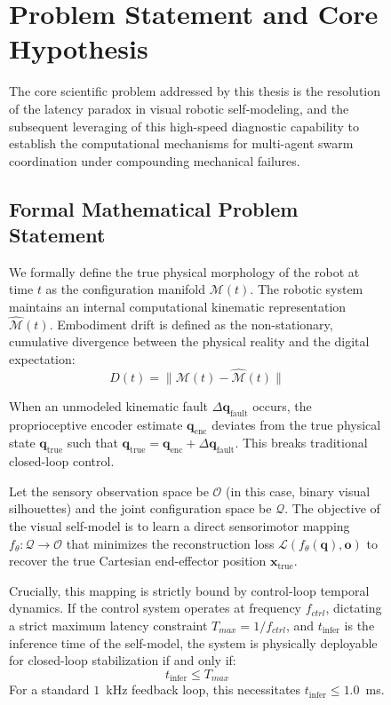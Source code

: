\documentclass[12pt,a4paper,oneside]{report}
\begin{document}
\begin{figure}[H]
\section{Problem Statement and Core Hypothesis}
\label{sec:problem_hypothesis_intro}

The core scientific problem addressed by this thesis is the resolution of the latency paradox in visual robotic self-modeling, and the subsequent leveraging of this high-speed diagnostic capability to establish the computational mechanisms for multi-agent swarm coordination under compounding mechanical failures.

\subsection{Formal Mathematical Problem Statement}
\label{subsec:formal_mathematical_problem_statement_intro}

We formally define the true physical morphology of the robot at time $t$ as the configuration manifold $\mathcal{M}(t)$. The robotic system maintains an internal computational kinematic representation $\hat{\mathcal{M}}(t)$. Embodiment drift is defined as the non-stationary, cumulative divergence between the physical reality and the digital expectation:
\begin{equation}
D(t) = \|\mathcal{M}(t) - \hat{\mathcal{M}}(t)\|
\end{equation}

When an unmodeled kinematic fault $\Delta \mathbf{q}_{\text{fault}}$ occurs, the proprioceptive encoder estimate $\mathbf{q}_{\text{enc}}$ deviates from the true physical state $\mathbf{q}_{\text{true}}$ such that $\mathbf{q}_{\text{true}} = \mathbf{q}_{\text{enc}} + \Delta \mathbf{q}_{\text{fault}}$. This breaks traditional closed-loop control. 

Let the sensory observation space be $\mathcal{O}$ (in this case, binary visual silhouettes) and the joint configuration space be $\mathcal{Q}$. The objective of the visual self-model is to learn a direct sensorimotor mapping $f_\theta: \mathcal{Q} \rightarrow \mathcal{O}$ that minimizes the reconstruction loss $\mathcal{L}(f_\theta(\mathbf{q}), \mathbf{o})$ to recover the true Cartesian end-effector position $\mathbf{x}_{\text{true}}$. 

Crucially, this mapping is strictly bound by control-loop temporal dynamics. If the control system operates at frequency $f_{ctrl}$, dictating a strict maximum latency constraint $T_{max} = 1/f_{ctrl}$, and $t_{\text{infer}}$ is the inference time of the self-model, the system is physically deployable for closed-loop stabilization if and only if:
\begin{equation}
t_{\text{infer}} \le T_{max}
\end{equation}
For a standard $1$~kHz feedback loop, this necessitates $t_{\text{infer}} \le 1.0$~ms. 


\end{figure}
\end{document}
